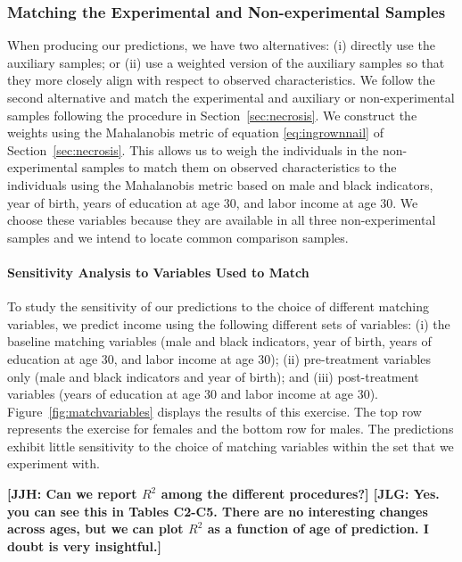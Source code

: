 \subsubsection{Matching the Experimental and Non-experimental Samples} \label{appendix:match}

\noindent When producing our predictions, we have two alternatives: (i) directly use the auxiliary samples; or (ii) use a weighted version of the auxiliary samples so that they more closely align with respect to observed characteristics. We follow the second alternative and match the experimental and auxiliary or non-experimental samples following the procedure in Section~\ref{sec:necrosis}. We construct the weights using the Mahalanobis metric of equation \eqref{eq:ingrownnail} of Section~\ref{sec:necrosis}. This allows us to weigh the individuals in the non-experimental samples to match them on observed characteristics to the individuals using the Mahalanobis metric based on male and black indicators, year of birth, years of education at age 30, and labor income at age 30. We choose these variables because they are available in all three non-experimental samples and we intend to locate common comparison samples.

\paragraph{Sensitivity Analysis to Variables Used to Match}

\noindent To study the sensitivity of our predictions to the choice of different matching variables, we predict income using the following different sets of variables: (i) the baseline matching variables (male and black indicators, year of birth, years of education at age 30, and labor income at age 30); (ii) pre-treatment variables only (male and black indicators and year of birth); and (iii) post-treatment variables (years of education at age 30 and labor income at age 30). Figure~\ref{fig:matchvariables} displays the results of this exercise. The top row represents the exercise for females and the bottom row for males. The predictions exhibit little sensitivity to the choice of matching variables within the set that we experiment with.

\textbf{[JJH: Can we report $R^2$ among the different procedures?] [JLG: Yes. you can see this in Tables C2-C5. There are no interesting changes across ages, but we can plot $R^2$ as a function of age of prediction. I doubt is very insightful.] }

